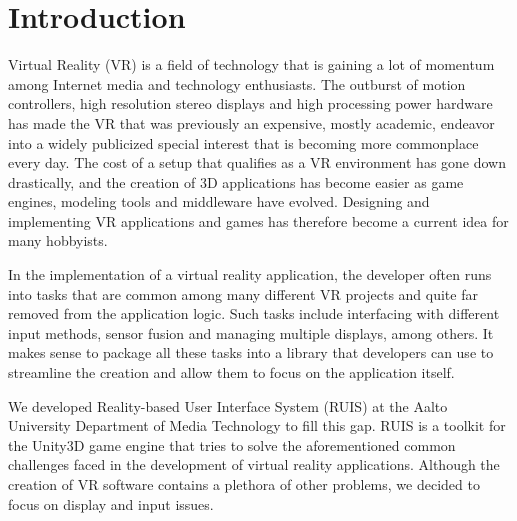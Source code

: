 \documentclass[12pt,a4paper,oneside,pdftex]{report}
\begin{document}
\label{pages-prelude}
\cleardoublepage

\startfirstchapter

\pagestyle{headings}


% 

\chapter{Introduction}
\label{chapter:intro}

Virtual Reality (VR) is a field of technology that is gaining a lot of momentum among Internet media and technology enthusiasts. The outburst of motion controllers, high resolution stereo displays and high processing power hardware has made the VR that was previously an expensive, mostly academic, endeavor into a widely publicized special interest that is becoming more commonplace every day. The cost of a setup that qualifies as a VR environment has gone down drastically, and the creation of 3D applications has become easier as game engines, modeling tools and middleware have evolved. Designing and implementing VR applications and games has therefore become a current idea for many hobbyists.

In the implementation of a virtual reality application, the developer often runs into tasks that are common among many different VR projects and quite far removed from the application logic. Such tasks include interfacing with different input methods, sensor fusion and managing multiple displays, among others. It makes sense to package all these tasks into a library that developers can use to streamline the creation and allow them to focus on the application itself. 

We developed Reality-based User Interface System (RUIS) at the Aalto University Department of Media Technology to fill this gap. RUIS is a toolkit for the Unity3D game engine that tries to solve the aforementioned common challenges faced in the development of virtual reality applications. Although the creation of VR software contains a plethora of other problems, we decided to focus on display and input issues.
\end{document}
